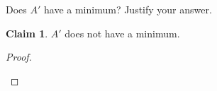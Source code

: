 \documentclass{homework}
\newcommand{\Z}{\bb{Z}} %
\newcommand{\N}{\bb{N}} %
\newcommand{\Ra}{\Rightarrow}
\newcommand{\?}{\stackrel{?}{=}}
\theoremstyle{definition}
\newtheorem*{claim}{Claim}
\begin{document}
\question Does $A'$ have a minimum? Justify your answer. 
\begin{claim}
    $A'$ does not have a minimum.
\end{claim}
\begin{proof}
     \begin{enumerate}
    





\end{enumerate}
\end{proof}
\end{document}
